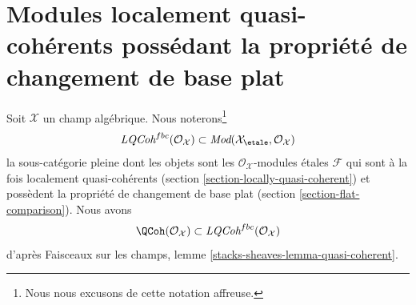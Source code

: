 \section{Modules localement quasi-cohérents possédant la propriété de changement de base plat}
\label{section-loc-qcoh-flat-base-change}

\noindent
Soit $\mathcal{X}$ un champ algébrique. Nous noterons\footnote{Nous nous excusons
de cette notation affreuse.}
$$
\textit{LQCoh}^{fbc}(\mathcal{O}_\mathcal{X})
\subset
\textit{Mod}(\mathcal{X}_\etale, \mathcal{O}_\mathcal{X})
$$
la sous-catégorie pleine dont les objets sont les
$\mathcal{O}_\mathcal{X}$-modules étales $\mathcal{F}$
qui sont à la fois localement quasi-cohérents
(section \ref{section-locally-quasi-coherent})
et possèdent la propriété de changement de base plat
(section \ref{section-flat-comparison}).
Nous avons
$$
\QCoh(\mathcal{O}_\mathcal{X}) \subset
\textit{LQCoh}^{fbc}(\mathcal{O}_\mathcal{X})
$$
d'après Faisceaux sur les champs, lemme \ref{stacks-sheaves-lemma-quasi-coherent}.

